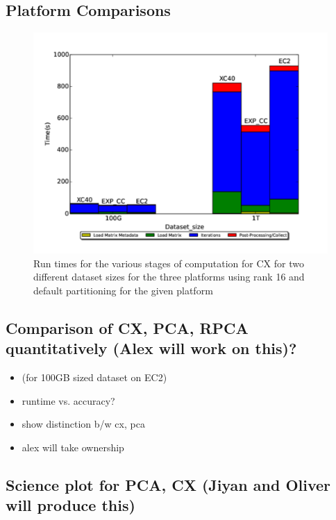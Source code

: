   \subsection{Platform Comparisons}
    
    \begin{figure} [H]
    \begin{centering}
    \includegraphics[scale=0.4]{images/CX_Size_Scaling_Rank_16_Partitions_default.pdf}
    \end{centering}
    \caption{ Run times for the various stages of computation for CX for two different dataset sizes for the three platforms using rank 16 and default partitioning for the given platform} 
    \label{fig:h2hrank16} 
    \end{figure}

    
  

  

  \subsection{Comparison of CX, PCA, RPCA quantitatively (Alex will work on this)? }
    \begin{itemize}
      \item (for 100GB sized dataset on EC2)
      \item runtime vs. accuracy?
      \item show distinction b/w cx, pca
      \item alex will take ownership
    \end{itemize}

  \subsection{Science plot for PCA, CX (Jiyan and Oliver will produce this)}

